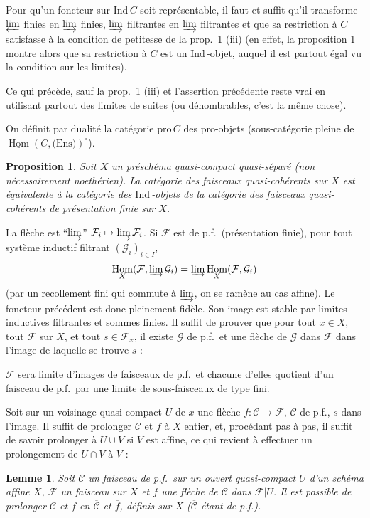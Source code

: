 \documentclass[12pt]{amsart}
\theoremstyle{plain}
\newtheorem{prop}{Proposition}
\newtheorem{lem}{Lemme}
\theoremstyle{definition}
\DeclareMathOperator{\Hom}{Hom}
\newcommand{\Ind}{\text{Ind}\,}
\newcommand{\Pro}{\text{pro}\,}
\newcommand{\cF}{\mathcal{F}}
\newcommand{\cG}{\mathcal{G}}
\newcommand{\cC}{\mathcal{C}}
\begin{document}
Pour qu'un foncteur sur $\Ind C$ soit repr\'esentable, il faut et suffit qu'il transforme $\varprojlim$ finies en $\varinjlim$ finies, $\varinjlim$ filtrantes en $\varinjlim$ filtrantes et que sa restriction \`a $C$ satisfasse \`a la condition de petitesse de la prop.\ 1 (iii) (en effet, la proposition 1 montre alors que sa restriction \`a $C$ est un $\Ind$-objet, auquel il est partout \'egal vu la condition sur les limites).

Ce qui pr\'ec\`ede, sauf la prop.\ 1 (iii) et l'assertion pr\'ec\'edente reste vrai en utilisant partout des limites de suites (ou d\'enombrables, c'est la m\^eme chose).

On d\'efinit par dualit\'e la cat\'egorie $\Pro C$ des pro-objets (sous-cat\'egorie pleine de $\underline{\Hom}(C,\text{(Ens)})^{\circ}$).

\begin{prop}
Soit $X$ un pr\'esch\'ema quasi-compact quasi-s\'epar\'e (non n\'ecessairement noeth\'erien). La cat\'egorie des faisceaux quasi-coh\'erents sur $X$ est \'equivalente \`a la cat\'egorie des $\Ind$-objets de la cat\'egorie des faisceaux quasi-coh\'erents de pr\'esentation finie sur $X$.
\end{prop}

La fl\`eche est ``$\varinjlim$'' $\cF_{i} \mapsto \varinjlim \cF_{i}$. Si $\cF$ est de p.f.\ (pr\'esentation finie), pour tout syst\`eme inductif filtrant $(\cG_{i})_{i \in I}$,
\[
\Hom_{X}(\cF, \varinjlim \cG_{i}) = \varinjlim \Hom_{X}(\cF, \cG_{i})
\]
(par un recollement fini qui commute \`a $\varinjlim$, on se ram\`ene au cas affine). Le foncteur pr\'ec\'edent est donc pleinement fid\`ele. Son image est stable par limites inductives filtrantes et sommes finies. Il suffit de prouver que pour tout $x \in X$, tout $\cF$ sur $X$, et tout $s \in \cF_{x}$, il existe $\cG$ de p.f.\ et une fl\`eche de $\cG$ dans $\cF$ dans l'image de laquelle se trouve $s$ :

$\cF$ sera limite d'images de faisceaux de p.f.\ et chacune d'elles quotient d'un faisceau de p.f.\ par une limite de sous-faisceaux de type fini.

Soit sur un voisinage quasi-compact $U$ de $x$ une fl\`eche $f: \cC \to \cF$, $\cC$ de p.f., $s$ dans l'image. Il suffit de prolonger $\cC$ et $f$ \`a $X$ entier, et, proc\'edant pas \`a pas, il suffit de savoir prolonger \`a $U \cup V$ si $V$ est affine, ce qui revient \`a effectuer un prolongement de $U \cap V$ \`a $V$ :

\begin{lem}
Soit $\cC$ un faisceau de p.f.\ sur un ouvert quasi-compact $U$ d'un sch\'ema affine $X$, $\cF$ un faisceau sur $X$ et $f$ une fl\`eche de $\cC$ dans $\cF|U$. Il est possible de prolonger $\cC$ et $f$ en $\overline{\cC}$ et $\overline{f}$, d\'efinis sur $X$ ($\overline{\cC}$ \'etant de p.f.).
\end{lem}
\end{document}

